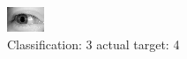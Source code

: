 \begin{figure}[h!]
\begin{center}
\includegraphics[width=0.60\columnwidth]{figures/ID3181_class_3_target_4.png}
\end{center}
\caption{ Classification: 3 actual target: 4}
\label{fig:ID3181_class_3_target_4}
\end{figure}
